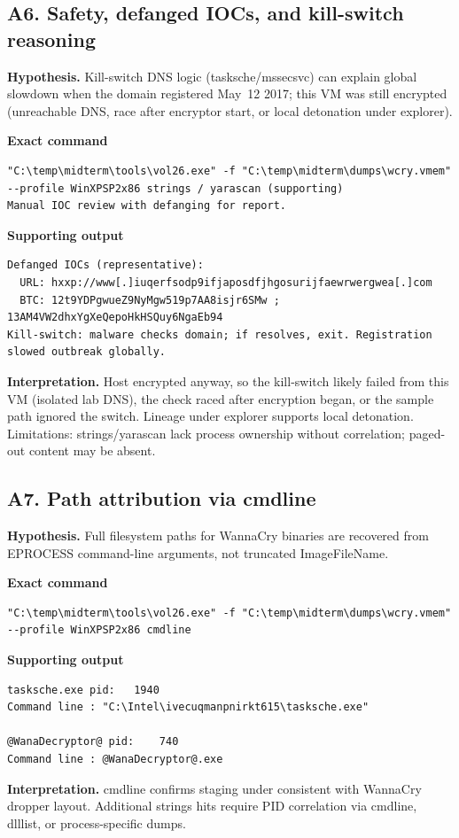 \documentclass[11pt,letterpaper]{article}
\newcommand{\winpath}[1]{\texttt{\seqsplit{#1}}}
\begin{document}
\subsection*{A6. Safety, defanged IOCs, and kill-switch reasoning}
\textbf{Hypothesis.} Kill-switch DNS logic (tasksche/mssecsvc) can explain global slowdown when the domain registered May~12 2017; this VM was still encrypted (unreachable DNS, race after encryptor start, or local detonation under explorer).
\par\medskip\noindent\textbf{Exact command}
\begin{lstlisting}
"C:\temp\midterm\tools\vol26.exe" -f "C:\temp\midterm\dumps\wcry.vmem" --profile WinXPSP2x86 strings / yarascan (supporting)
Manual IOC review with defanging for report.
\end{lstlisting}
\noindent\textbf{Supporting output}
\begin{lstlisting}
Defanged IOCs (representative):
  URL: hxxp://www[.]iuqerfsodp9ifjaposdfjhgosurijfaewrwergwea[.]com
  BTC: 12t9YDPgwueZ9NyMgw519p7AA8isjr6SMw ; 13AM4VW2dhxYgXeQepoHkHSQuy6NgaEb94
Kill-switch: malware checks domain; if resolves, exit. Registration slowed outbreak globally.
\end{lstlisting}
\noindent\textbf{Interpretation.} Host encrypted anyway, so the kill-switch likely failed from this VM (isolated lab DNS), the check raced after encryption began, or the sample path ignored the switch. Lineage under explorer supports local detonation. Limitations: strings/yarascan lack process ownership without correlation; paged-out content may be absent.
\vspace{0.55em}

\subsection*{A7. Path attribution via cmdline}
\textbf{Hypothesis.} Full filesystem paths for WannaCry binaries are recovered from EPROCESS command-line arguments, not truncated ImageFileName.
\par\medskip\noindent\textbf{Exact command}
\begin{lstlisting}
"C:\temp\midterm\tools\vol26.exe" -f "C:\temp\midterm\dumps\wcry.vmem" --profile WinXPSP2x86 cmdline
\end{lstlisting}
\noindent\textbf{Supporting output}
\begin{lstlisting}
tasksche.exe pid:   1940
Command line : "C:\Intel\ivecuqmanpnirkt615\tasksche.exe"

@WanaDecryptor@ pid:    740
Command line : @WanaDecryptor@.exe
\end{lstlisting}
\noindent\textbf{Interpretation.} cmdline confirms staging under \winpath{C:/Intel/.../} consistent with WannaCry dropper layout. Additional strings hits require PID correlation via cmdline, dlllist, or process-specific dumps.
\vspace{0.55em}
\end{document}
